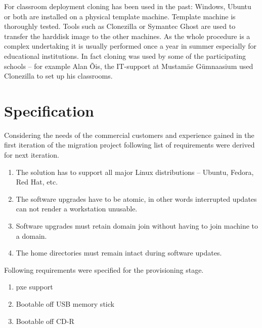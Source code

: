 \documentclass[a4paper,11pt]{kth-mag}
\begin{document}
For classroom deployment cloning has been used in the past:
Windows, Ubuntu or both are installed on a physical template machine.
Template machine is thoroughly tested.
Tools such as Clonezilla \cite{clonezilla} or Symantec Ghost are used to transfer the
harddisk image to the other machines.
As the whole procedure is a complex undertaking
it is usually performed once a year in summer especially for
educational institutions.
In fact cloning was used by some of the participating
schools -- for example Alan Õis, the IT-support at Mustamäe Gümnaasium
used Clonezilla to set up his classrooms.





\section{Specification}

Considering the needs of the commercial customers and
experience gained in the first iteration of the migration project
following list of requirements were derived for next iteration.

\begin{enumerate}
\item The solution has to support all major Linux distributions -- Ubuntu, Fedora, Red Hat, etc.
\item The software upgrades have to be atomic, in other words interrupted updates can not render a workstation unusable.
\item Software upgrades must retain domain join without having to join machine to a domain.
\item The home directories must remain intact during software updates.
\end{enumerate}

\noindent Following requirements were specified for the provisioning stage.

\begin{enumerate}
\item \acrfull{pxe} support
\item Bootable off USB memory stick
\item Bootable off CD-R
\end{enumerate}
\end{document}
